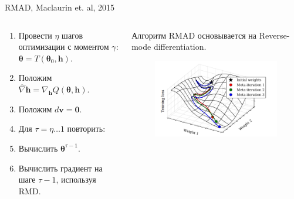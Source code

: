 \documentclass[10pt,pdf,utf8,russian,aspectratio=169]{beamer}
\begin{document}
\begin{frame}{RMAD, Maclaurin et. al, 2015 }
\begin{columns}
\begin{column}{0.5\textwidth}
\begin{enumerate}
\item Провести $\eta$ шагов оптимизации с моментом $\gamma$: $\boldsymbol{\theta} = T(\boldsymbol{\theta}_0, \mathbf{h})$.
\item Положим $\hat{\nabla} \mathbf{h} = \nabla_\mathbf{h} Q(\boldsymbol{\theta}, \mathbf{h}).$ 
\item Положим $d\mathbf{v} = \mathbf{0}.$
\item Для $\tau = \eta \dots 1 $ повторить:
\item \quad Вычислить $\boldsymbol{\theta}^{\tau-1}$.
\item \quad Вычислить градиент на шаге $\tau-1$, используя RMD.
\end{enumerate}
\end{column}


\begin{column}{0.5\textwidth}
Алгоритм RMAD основывается на Reverse-mode differentiation.
\begin{figure}
\includegraphics[width=\textwidth]{grad.png}
\end{figure}
\end{column}
\end{columns}
\end{frame}
\end{document}
